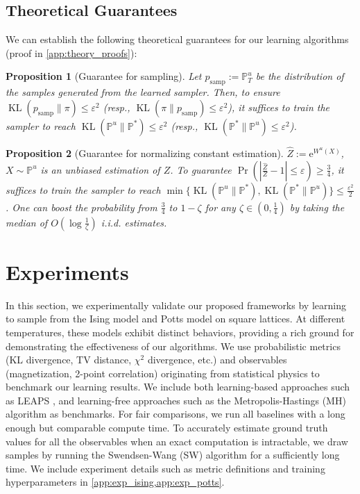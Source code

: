 \documentclass{article}
\newtheorem{proposition}{Proposition}
\theoremstyle{remark}
\newcommand{\ro}[1]{\left(#1\right)} %
\newcommand{\abs}[1]{\left|#1\right|}
\newcommand{\e}{\mathrm{e}}
\renewcommand{\P}{\mathbb{P}}
\newcommand{\kl}{\operatorname{KL}}
\newcommand{\Zh}{\widehat{Z}}
\newcommand{\psamp}{p_{\mathrm{samp}}}
\begin{document}
\subsection{Theoretical Guarantees}
\label{sec:sampler_guarantee}
We can establish the following theoretical guarantees for our learning algorithms (proof in \cref{app:theory_proofs}):
\begin{proposition}[Guarantee for sampling]
Let $\psamp:=\P^u_T$ be the distribution of the samples generated from the learned sampler. Then, to ensure $\kl(\psamp\|\pi)\le\varepsilon^2$ (resp., $\kl(\pi\|\psamp)\le\varepsilon^2$), it suffices to train the sampler to reach $\kl(\P^u\|\P^*)\le\varepsilon^2$ (resp., $\kl(\P^*\|\P^u)\le\varepsilon^2$).
\label{lem:guarantee_samp}
\end{proposition}

\begin{proposition}[Guarantee for normalizing constant estimation]
$\Zh:=\e^{W^u(X)}$, $X\sim\P^u$ is an unbiased estimation of $Z$. To guarantee $\Pr\ro{\abs{\frac{\Zh}{Z}-1}\le\varepsilon}\ge\frac34$, it suffices to train the sampler to reach $\min\{\kl(\P^u\|\P^*),\kl(\P^*\|\P^u)\}\le\frac{\varepsilon^2}{2}$. One can boost the probability from $\frac34$ to $1-\zeta$ for any $\zeta\in\ro{0,\frac{1}{4}}$ by taking the median of $O\ro{\log\frac1\zeta}$ i.i.d. estimates.
\label{lem:guarantee_norm_const_est}
\end{proposition}




\section{Experiments}
\label{sec:exp}
In this section, we experimentally validate our proposed frameworks by learning to sample from the Ising model and Potts model on 
%
square lattices.
%
At different temperatures, these models exhibit distinct behaviors, providing a rich ground for demonstrating the effectiveness of our algorithms. We use probabilistic metrics (KL divergence, TV distance, $\chi^2$ divergence, etc.) and observables (magnetization, 2-point correlation) originating from statistical physics to benchmark our learning results. We include both learning-based approaches such as LEAPS \cite{holderrieth2025leaps}, and learning-free approaches such as the Metropolis-Hastings (MH) algorithm as benchmarks. For fair comparisons, we run all baselines with a long enough but comparable compute time. To accurately estimate ground truth values for all the observables when an exact computation is intractable, we draw samples by running the Swendsen-Wang (SW) algorithm \cite{swendsen1986replica, swendsen1987nonuniversal} for a sufficiently long time. We include experiment details such as metric definitions and training hyperparameters in \cref{app:exp_ising,app:exp_potts}.
\end{document}

